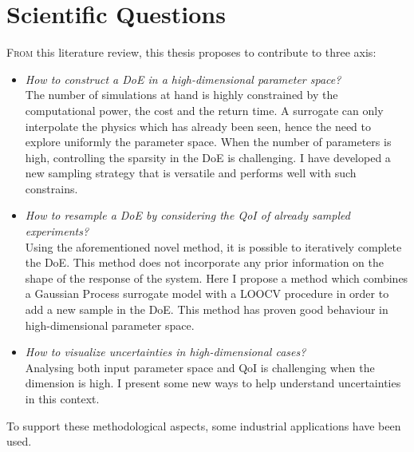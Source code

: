 


\chapter{Scientific Questions}\label{chap:questions}

\lettrine{F}{rom} this literature review, this thesis proposes to contribute to three axis:

\begin{itemize}
\item \emph{How to construct a DoE in a high-dimensional parameter space?}\hfill\\
	The number of simulations at hand is highly constrained by the computational power, the cost and the return time. A surrogate can only interpolate the physics which has already been seen, hence the need to explore uniformly the parameter space. When the number of parameters is high, controlling the sparsity in the DoE is challenging. I have developed a new sampling strategy that is versatile and performs well with such constrains.
	
\item \emph{How to resample a DoE by considering the QoI of already sampled experiments?}\hfill\\
	Using the aforementioned novel method, it is possible to iteratively complete the DoE. This method does not incorporate any prior information on the shape of the response of the system. Here I propose a method which combines a Gaussian Process surrogate model with a LOOCV procedure in order to add a new sample in the DoE. This method has proven good behaviour in high-dimensional parameter space.

\item \emph{How to visualize uncertainties in high-dimensional cases?}\hfill\\
    Analysing both input parameter space and QoI is challenging when the dimension is high. I present some new ways to help understand uncertainties in this context.
\end{itemize}

To support these methodological aspects, some industrial applications have been used.



